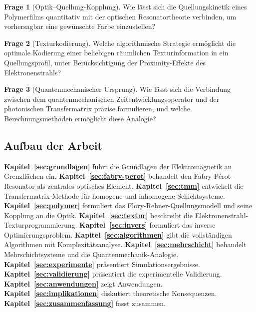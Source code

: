 ﻿\documentclass[a4paper,12pt]{article}
\theoremstyle{definition}
\newtheorem{frage}{Frage}[section]
\begin{document}
	\begin{frage}[Optik--Quellung-Kopplung]
		Wie lässt sich die Quellungskinetik eines Polymerfilms quantitativ mit der
		optischen Resonatortheorie verbinden, um vorhersagbar eine gewünschte Farbe
		einzustellen?
	\end{frage}
	
	\begin{frage}[Texturkodierung]
		Welche algorithmische Strategie ermöglicht die optimale Kodierung einer
		beliebigen räumlichen Texturinformation in ein Quellungsprofil, unter
		Berücksichtigung der Proximity-Effekte des Elektronenstrahls?
	\end{frage}
	
	\begin{frage}[Quantenmechanischer Ursprung]
		Wie lässt sich die Verbindung zwischen dem quantenmechanischen
		Zeitentwicklungsoperator und der photonischen Transfermatrix präzise
		formulieren, und welche Berechnungsmethoden ermöglicht diese Analogie?
	\end{frage}
	
	\subsection{Aufbau der Arbeit}
	
	\textbf{Kapitel~\ref{sec:grundlagen}} führt die Grundlagen der Elektromagnetik
	an Grenzflächen ein.
	\textbf{Kapitel~\ref{sec:fabry-perot}} behandelt den Fabry-Pérot-Resonator
	als zentrales optisches Element.
	\textbf{Kapitel~\ref{sec:tmm}} entwickelt die Transfermatrix-Methode für
	homogene und inhomogene Schichtsysteme.
	\textbf{Kapitel~\ref{sec:polymer}} formuliert das Flory-Rehner-Quellungsmodell
	und seine Kopplung an die Optik.
	\textbf{Kapitel~\ref{sec:textur}} beschreibt die Elektronenstrahl-Texturprogrammierung.
	\textbf{Kapitel~\ref{sec:invers}} formuliert das inverse Optimierungsproblem.
	\textbf{Kapitel~\ref{sec:algorithmen}} gibt die vollständigen Algorithmen
	mit Komplexitätsanalyse.
	\textbf{Kapitel~\ref{sec:mehrschicht}} behandelt Mehrschichtsysteme und die
	Quantenmechanik-Analogie.
	\textbf{Kapitel~\ref{sec:experimente}} präsentiert Simulationsergebnisse.
	\textbf{Kapitel~\ref{sec:validierung}} präsentiert die experimentelle Validierung.
	\textbf{Kapitel~\ref{sec:anwendungen}} zeigt Anwendungen.
	\textbf{Kapitel~\ref{sec:implikationen}} diskutiert theoretische Konsequenzen.
	\textbf{Kapitel~\ref{sec:zusammenfassung}} fasst zusammen.
	
\end{document}
